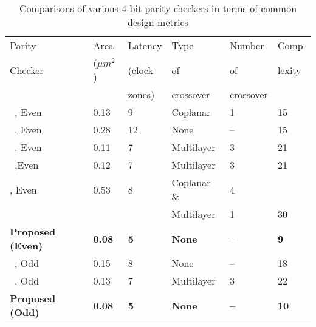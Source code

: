\documentclass[conference]{IEEEtran}
\begin{document}
\begin{table}[!htb]
\begin{center}
\scriptsize
\caption{\small Comparisons of various $4$-bit parity checkers in terms of common design metrics}
\label{tab:4bitepc}
\vspace{0.3cm}
\begin{tabular}{|l|l|l|l|l|l|}
\hline
Parity & Area & Latency & Type & Number  & Comp-  \\
Checker & ($\mu m^2$) & (clock  & of & of & lexity\\
& & zones) & crossover & crossover & \\
\hline       
~\cite{S_utpal2014}, Even & 0.13 & 9 & Coplanar & 1 & 15 \\ 
\hline
~\cite{beigh_ijpap2013}, Even & 0.28 & 12 & None & -- & 15 \\
\hline
~\cite{firdous_2015}, Even & 0.11 & 7 & Multilayer & 3 & 21 \\
\hline
~\cite{firdous_bhat2014},Even & 0.12 & 7 & Multilayer & 3 & 21 \\
\hline
\cite{teja_nems2008}, Even  &  0.53 & 8  & Coplanar \& & 4  & \\&&&Multilayer&1&30\\
\hline
{\bf Proposed (Even)} & {\bf 0.08} & {\bf 5} & {\bf None} & {\bf --} & {\bf 9} \\
\hline
~\cite{Das_FITEE_2016}, Odd & 0.15 & 8 & None & -- & 18 \\
\hline
~\cite{firdous_2015}, Odd & 0.13 & 7 & Multilayer & 3 & 22 \\
\hline
 
{\bf Proposed (Odd)} & {\bf 0.08} & {\bf 5} & {\bf None} & {\bf --} & {\bf 10} \\
\hline
\end{tabular}
\end{center}
\end{table}
\end{document}
